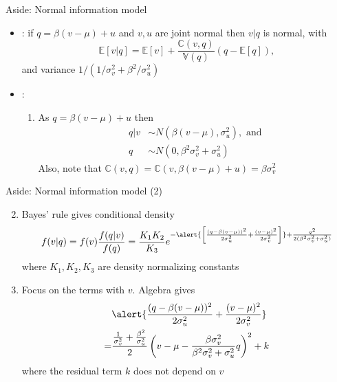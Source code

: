 \documentclass[english,10pt
,aspectratio=169
]{beamer}
\begin{document}
\begin{frame}{Aside: Normal information model}
\begin{itemize}
	\item {}: if $q=\beta(v-\mu) + u$ and $v,u$ are joint normal then $v|q$ is normal, with
	\[
	\mathbb{E}[v|q] = \mathbb{E}[v] + \frac{\mathbb{C}(v,q)}{\mathbb{V}(q)} (q-\mathbb{E}[q]),
	\]
	and variance $1/(1/\sigma^2_v + \beta^2 / \sigma^2_u)$
	\item {}:
	\begin{enumerate}
		\item As $q=\beta(v-\mu) + u$ then 
		\begin{align*}
		q|v & \sim N(\beta(v-\mu), \sigma^2_u), \text{ and} \\
		q    & \sim N(0, \beta^2 \sigma^2_v+\sigma^2_u)
		\end{align*}
		Also, note that $\mathbb{C}(v,q)= \mathbb{C}(v, \beta(v-\mu)+u)=\beta\sigma^2_v$
	\end{enumerate}
\end{itemize}
\end{frame}


\begin{frame}{Aside: Normal information model (2)}
	\begin{enumerate}
		\setcounter{enumi}{1}
		\item Bayes' rule gives conditional density
		\[
		f(v|q) = f(v) \frac{f(q|v)}{f(q)} = \frac{K_1 K_2}{K_3} e^{-\alert{\left[\frac{(q-\beta(v-\mu))^2}{2\sigma^2_u }+\frac{(v-\mu)^2}{2\sigma^2_v}\right]} + \frac{q^2}{2(\beta^2 \sigma^2_v + \sigma^2_u)}}
		\]
		where $K_1, K_2, K_3$ are density normalizing constants
		\item Focus on the terms with \alert{$v$}. Algebra gives
		\begin{align*}
		&\alert{\frac{(q-\beta(v-\mu))^2}{2\sigma^2_u} + \frac{(v-\mu)^2}{2\sigma^2_v} }\\
		= &\frac{\frac{1}{\sigma^2_v}+\frac{\beta^2}{\sigma^2_u}}{2}\left(v-\mu-\frac{\beta \sigma^2_v}{\beta^2 \sigma^2_v + \sigma^2_u}q \right)^2 + k
		\end{align*}
		where the residual term $k$ does not depend on $v$
	\end{enumerate}
\end{frame}
\end{document}
